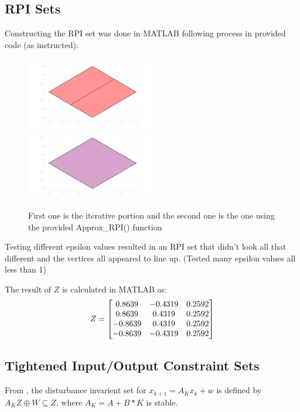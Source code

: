 \documentclass[]{article}
\begin{document}
\newpage
\subsection{RPI Sets}
Constructing the RPI set was done in MATLAB following process in provided code (as instructed):
\begin{figure}[h]
    \centering
    \includegraphics[width=0.5\textwidth]{figs/pblm2b_1.png}\\
    \includegraphics[width=0.5\textwidth]{figs/pblm2b_2.png}
    \caption{First one is the iterative portion and the second one is the one using the provided Approx\_RPI() function}
\end{figure}

Testing different epsilon values resulted in an RPI set that didn't look all that different and the vertices all appeared to line up. 
(Tested many epsilon values all less than 1)

The result of $Z$ is calculated in MATLAB as:
\begin{equation}
    Z = \mqty[
        0.8639  & -0.4319 & 0.2592 \\
        0.8639  & 0.4319  & 0.2592 \\
        -0.8639 & 0.4319  & 0.2592 \\
        -0.8639 & -0.4319 & 0.2592 ]
\end{equation}

\newpage
\subsection{Tightened Input/Output Constraint Sets}
From \cite{}, the disturbance invarient set for $x_{k+1} = A_K x_k + w$ is defined by $A_K Z \oplus W \subseteq Z$, where $A_K = A + B*K$ is stable.
\end{document}
